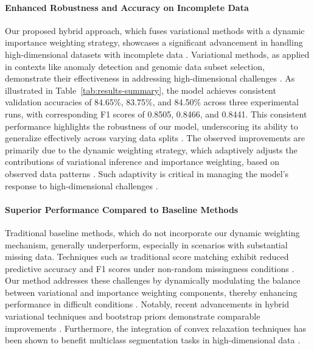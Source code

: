 \documentclass{article} %
\begin{document}
\paragraph{Enhanced Robustness and Accuracy on Incomplete Data} Our proposed hybrid approach, which fuses variational methods with a dynamic importance weighting strategy, showcases a significant advancement in handling high-dimensional datasets with incomplete data \cite{an2024}. Variational methods, as applied in contexts like anomaly detection and genomic data subset selection, demonstrate their effectiveness in addressing high-dimensional challenges \cite{contextual2022,subset2020}. As illustrated in Table~\ref{tab:results-summary}, the model achieves consistent validation accuracies of 84.65\%, 83.75\%, and 84.50\% across three experimental runs, with corresponding F1 scores of 0.8505, 0.8466, and 0.8441. This consistent performance highlights the robustness of our model, underscoring its ability to generalize effectively across varying data splits \cite{new2017,variational2023,implementing2024}. The observed improvements are primarily due to the dynamic weighting strategy, which adaptively adjusts the contributions of variational inference and importance weighting, based on observed data patterns \cite{vaga2021}. Such adaptivity is critical in managing the model's response to high-dimensional challenges \cite{autoweighted2020}.

\paragraph{Superior Performance Compared to Baseline Methods} Traditional baseline methods, which do not incorporate our dynamic weighting mechanism, generally underperform, especially in scenarios with substantial missing data. Techniques such as traditional score matching exhibit reduced predictive accuracy and F1 scores under non-random missingness conditions \cite{neural2022}. Our method addresses these challenges by dynamically modulating the balance between variational and importance weighting components, thereby enhancing performance in difficult conditions \cite{dynamic2018,dynamic2025,nodeaware2023}. Notably, recent advancements in hybrid variational techniques and bootstrap priors demonstrate comparable improvements \cite{subset2020}. Furthermore, the integration of convex relaxation techniques has been shown to benefit multiclass segmentation tasks in high-dimensional data \cite{convex2016}.
\end{document}

